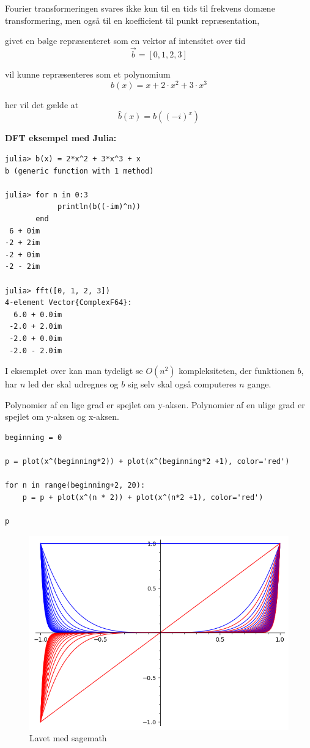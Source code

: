 \documentclass[11pt,a4paper]{article}
\begin{document}
Fourier transformeringen svares ikke kun til en tids til frekvens domæne transformering,
men også til en koefficient til punkt repræsentation,

givet en bølge repræsenteret som en vektor af intensitet over tid
$$
\vec{b} = [0, 1, 2, 3]
$$

vil kunne repræsenteres som et polynomium
$$
b(x) = x + 2\cdot x^2 + 3\cdot x^3
$$

her vil det gælde at
$$
\hat{b}(x) = b((-i)^x)
$$

\textbf{DFT eksempel med Julia:}
\begin{verbatim}
julia> b(x) = 2*x^2 + 3*x^3 + x
b (generic function with 1 method)

julia> for n in 0:3
            println(b((-im)^n))
       end
 6 + 0im
-2 + 2im
-2 + 0im
-2 - 2im

julia> fft([0, 1, 2, 3])
4-element Vector{ComplexF64}:
  6.0 + 0.0im
 -2.0 + 2.0im
 -2.0 + 0.0im
 -2.0 - 2.0im
\end{verbatim}

I eksemplet over kan man tydeligt se \(O(n^2)\) kompleksiteten,
der funktionen \(b\), har \(n\) led der skal udregnes
og \(b\) sig selv skal også computeres \(n\) gange.

Polynomier af en lige grad er spejlet om y-aksen.
Polynomier af en ulige grad er spejlet om y-aksen og x-aksen.

\begin{verbatim}
beginning = 0

p = plot(x^(beginning*2)) + plot(x^(beginning*2 +1), color='red')

for n in range(beginning+2, 20):
    p = p + plot(x^(n * 2)) + plot(x^(n*2 +1), color='red')

p
\end{verbatim}

\begin{figure}[htbp]
\centering
\includegraphics[width=.9\linewidth]{even_and_odd.png}
\caption{Lavet med sagemath}
\end{figure}
\end{document}
